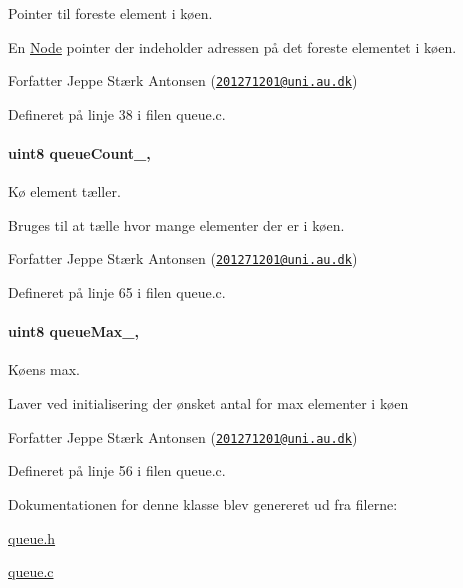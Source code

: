 Pointer til foreste element i køen. 

En \hyperlink{queue_8c_db/d8b/struct_node}{Node} pointer der indeholder adressen på det foreste elementet i køen.

\begin{DoxyAuthor}{Forfatter}
Jeppe Stærk Antonsen (\href{mailto:201271201@uni.au.dk}{\tt 201271201@uni.\+au.\+dk}) 
\end{DoxyAuthor}


Defineret på linje 38 i filen queue.\+c.

\paragraph[{\texorpdfstring{queue\+Count\+\_\+}{queueCount_}}]{\setlength{\rightskip}{0pt plus 5cm}uint8 queue\+Count\+\_\+\hspace{0.3cm}{\ttfamily [static]}, {\ttfamily [private]}}\hypertarget{class_queue_ad260f9ccca00e80d161bbf3e70c3ffa6}{}\label{class_queue_ad260f9ccca00e80d161bbf3e70c3ffa6}


Kø element tæller. 

Bruges til at tælle hvor mange elementer der er i køen.

\begin{DoxyAuthor}{Forfatter}
Jeppe Stærk Antonsen (\href{mailto:201271201@uni.au.dk}{\tt 201271201@uni.\+au.\+dk}) 
\end{DoxyAuthor}


Defineret på linje 65 i filen queue.\+c.

\paragraph[{\texorpdfstring{queue\+Max\+\_\+}{queueMax_}}]{\setlength{\rightskip}{0pt plus 5cm}uint8 queue\+Max\+\_\+\hspace{0.3cm}{\ttfamily [static]}, {\ttfamily [private]}}\hypertarget{class_queue_acb6b6e88c9e4d12839594b31e6ff7c5a}{}\label{class_queue_acb6b6e88c9e4d12839594b31e6ff7c5a}


Køens max. 

Laver ved initialisering der ønsket antal for max elementer i køen

\begin{DoxyAuthor}{Forfatter}
Jeppe Stærk Antonsen (\href{mailto:201271201@uni.au.dk}{\tt 201271201@uni.\+au.\+dk}) 
\end{DoxyAuthor}


Defineret på linje 56 i filen queue.\+c.



Dokumentationen for denne klasse blev genereret ud fra filerne\+:\begin{DoxyCompactItemize}
\item 
\hyperlink{queue_8h}{queue.\+h}\item 
\hyperlink{queue_8c}{queue.\+c}\end{DoxyCompactItemize}

